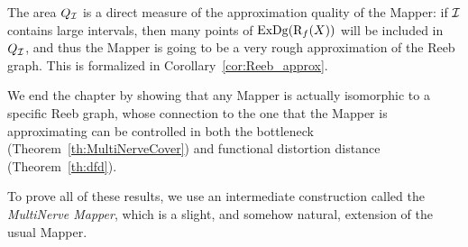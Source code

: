 The area $Q_{\mathcal{I}}$ is a direct measure of the approximation quality of the Mapper: 
if $\mathcal{I}$ contains large intervals, then many points of $\mathrm{ExDg}(\mathrm{R}_f(X))$ will be included in $Q_{\mathcal{I}}$, and  
thus the Mapper is going to be a very rough approximation of the Reeb graph. This is formalized in Corollary~\ref{cor:Reeb_approx}.

We end the chapter by showing that any Mapper %
is actually isomorphic to a specific Reeb graph, whose connection to the one that the Mapper is approximating
can be controlled in both the bottleneck (Theorem~\ref{th:MultiNerveCover}) and functional distortion distance (Theorem~\ref{th:dfd}).

To prove all of these results, we use an intermediate construction called the {\em MultiNerve Mapper},
which is a slight, and somehow natural, extension of the usual Mapper.





%


